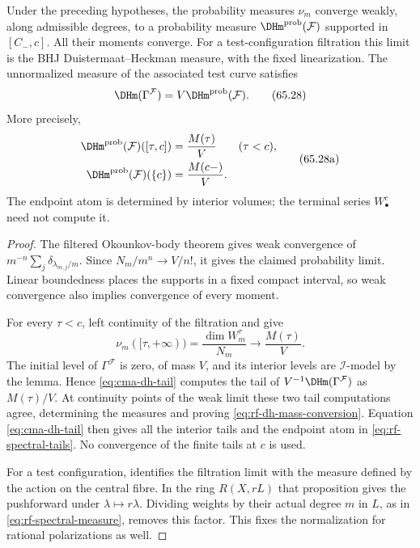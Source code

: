 \noindent\begin{minipage}{\linewidth}
\begin{theorem}\label{thm:rf-dh-quantization}
Under the preceding hypotheses, the probability measures $\nu_m$ converge weakly, along admissible degrees, to a probability measure $\DHm^{\mathrm{prob}}(\mathcal F)$ supported in $[C_-,c]$. All their moments converge. For a test-configuration filtration this limit is the BHJ Duistermaat--Heckman measure, with the fixed linearization. The unnormalized measure of the associated test curve satisfies
\[
                    \DHm(\Gamma^{\mathcal F})
                    =V\DHm^{\mathrm{prob}}(\mathcal F).
\tag{65.28}\label{eq:rf-dh-mass-conversion}
\]
More precisely,
\[
 \begin{aligned}
 \DHm^{\mathrm{prob}}(\mathcal F)([\tau,c])&=\frac{M(\tau)}V
                   &&(\tau<c),\\
 \DHm^{\mathrm{prob}}(\mathcal F)(\{c\})&=\frac{M(c-)}V.
 \end{aligned}
 \tag{65.28a}\label{eq:rf-spectral-tails}
\]
The endpoint atom is determined by interior volumes; the terminal series $W^c_\bullet$ need not compute it.
\end{theorem}
\end{minipage}\par

\begin{proof}
The filtered Okounkov-body theorem \cite[Theorem~1.11 and Remark~1.12, pp.~1213--1214]{BC11} gives weak convergence of $m^{-n}\sum_j\delta_{\lambda_{m,j}/m}$. Since $N_m/m^n\to V/n!$, it gives the claimed probability limit. Linear boundedness places the supports in a fixed compact interval, so weak convergence also implies convergence of every moment.

For every $\tau<c$, left continuity of the filtration and  give
\[
 \nu_m([\tau,+\infty))
   =\frac{\dim W^\tau_m}{N_m}
   \longrightarrow\frac{M(\tau)}V.
\]
The initial level of $\Gamma^{\mathcal F}$ is zero, of mass $V$, and its interior levels are $\mathcal I$-model by the lemma. Hence \eqref{eq:cma-dh-tail} computes the tail of $V^{-1}\DHm(\Gamma^{\mathcal F})$ as $M(\tau)/V$. At continuity points of the weak limit these two tail computations agree, determining the measures and proving \eqref{eq:rf-dh-mass-conversion}. Equation \eqref{eq:cma-dh-tail} then gives all the interior tails and the endpoint atom in \eqref{eq:rf-spectral-tails}. No convergence of the finite tails at $c$ is used.

For a test configuration, \cite[Proposition~5.9, p.~792]{BHJ17} identifies the filtration limit with the measure defined by the action on the central fibre. In the ring $R(X,rL)$ that proposition gives the pushforward under $\lambda\mapsto r\lambda$. Dividing weights by their actual degree $m$ in $L$, as in \eqref{eq:rf-spectral-measure}, removes this factor. This fixes the normalization for rational polarizations as well.
\end{proof}

